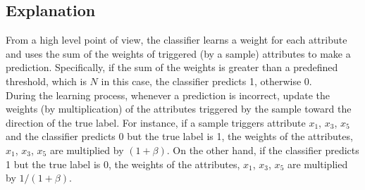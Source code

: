 \documentclass[11pt]{article}
\begin{document}
\subsection{Explanation}
From a high level point of view, the classifier learns a weight for each attribute and uses the sum of the weights of triggered (by a sample) attributes to make a prediction. Specifically, if the sum of the weights is greater than a predefined threshold, which is $N$ in this case, the classifier predicts 1, otherwise 0. \\
During the learning process, whenever a prediction is incorrect, update the weights (by multiplication) of the attributes triggered by the sample toward the direction of the true label. For instance, if a sample triggers attribute $x_1$, $x_3$, $x_5$ and the classifier predicts 0 but the true label is 1, the weights of the attributes, $x_1$, $x_3$, $x_5$ are multiplied by $(1 + \beta)$. On the other hand, if the classifier predicts 1 but the true label is 0, the weights of the attributes, $x_1$, $x_3$, $x_5$ are multiplied by $1 / (1 + \beta)$.

\vspace{-5mm}
\end{document}
